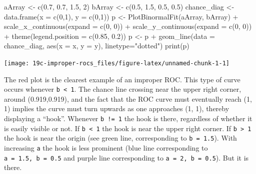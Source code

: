 \documentclass[
]{book}
\newenvironment{Shaded}{\begin{snugshade}}{\end{snugshade}}
\newcommand{\AttributeTok}[1]{\textcolor[rgb]{0.77,0.63,0.00}{#1}}
\newcommand{\DecValTok}[1]{\textcolor[rgb]{0.00,0.00,0.81}{#1}}
\newcommand{\FloatTok}[1]{\textcolor[rgb]{0.00,0.00,0.81}{#1}}
\newcommand{\FunctionTok}[1]{\textcolor[rgb]{0.00,0.00,0.00}{#1}}
\newcommand{\NormalTok}[1]{#1}
\newcommand{\OtherTok}[1]{\textcolor[rgb]{0.56,0.35,0.01}{#1}}
\newcommand{\SpecialCharTok}[1]{\textcolor[rgb]{0.00,0.00,0.00}{#1}}
\newcommand{\StringTok}[1]{\textcolor[rgb]{0.31,0.60,0.02}{#1}}
\begin{document}
\begin{Shaded}
\begin{Highlighting}[]
\NormalTok{  aArray }\OtherTok{\textless{}{-}} \FunctionTok{c}\NormalTok{(}\FloatTok{0.7}\NormalTok{, }\FloatTok{0.7}\NormalTok{, }\FloatTok{1.5}\NormalTok{, }\DecValTok{2}\NormalTok{)}
\NormalTok{  bArray }\OtherTok{\textless{}{-}} \FunctionTok{c}\NormalTok{(}\FloatTok{0.5}\NormalTok{, }\FloatTok{1.5}\NormalTok{, }\FloatTok{0.5}\NormalTok{, }\FloatTok{0.5}\NormalTok{)}
\NormalTok{  chance\_diag }\OtherTok{\textless{}{-}} \FunctionTok{data.frame}\NormalTok{(}\AttributeTok{x =} \FunctionTok{c}\NormalTok{(}\DecValTok{0}\NormalTok{,}\DecValTok{1}\NormalTok{), }\AttributeTok{y =} \FunctionTok{c}\NormalTok{(}\DecValTok{0}\NormalTok{,}\DecValTok{1}\NormalTok{))}
\NormalTok{  p }\OtherTok{\textless{}{-}} \FunctionTok{PlotBinormalFit}\NormalTok{(aArray, bArray) }\SpecialCharTok{+}
    \FunctionTok{scale\_x\_continuous}\NormalTok{(}\AttributeTok{expand =} \FunctionTok{c}\NormalTok{(}\DecValTok{0}\NormalTok{, }\DecValTok{0}\NormalTok{)) }\SpecialCharTok{+} 
    \FunctionTok{scale\_y\_continuous}\NormalTok{(}\AttributeTok{expand =} \FunctionTok{c}\NormalTok{(}\DecValTok{0}\NormalTok{, }\DecValTok{0}\NormalTok{)) }\SpecialCharTok{+}
    \FunctionTok{theme}\NormalTok{(}\AttributeTok{legend.position =} \FunctionTok{c}\NormalTok{(}\FloatTok{0.85}\NormalTok{, }\FloatTok{0.2}\NormalTok{))}
\NormalTok{p }\OtherTok{\textless{}{-}}\NormalTok{ p }\SpecialCharTok{+} \FunctionTok{geom\_line}\NormalTok{(}\AttributeTok{data =}\NormalTok{ chance\_diag, }\FunctionTok{aes}\NormalTok{(}\AttributeTok{x =}\NormalTok{ x, }\AttributeTok{y =}\NormalTok{ y), }\AttributeTok{linetype=}\StringTok{"dotted"}\NormalTok{)}
\FunctionTok{print}\NormalTok{(p)}
\end{Highlighting}
\end{Shaded}

\begin{center}\texttt{[image: 19c-improper-rocs\_files/figure-latex/unnamed-chunk-1-1]} \end{center}

The red plot is the clearest example of an improper ROC. This type of curve occurs whenever \texttt{b\ \textless{}\ 1}. The chance line crossing near the upper right corner, around (0.919,0.919), and the fact that the ROC curve must eventually reach (1, 1) implies the curve must turn upwards as one approaches (1, 1), thereby displaying a ``hook''. Whenever \texttt{b\ !=\ 1} the hook is there, regardless of whether it is easily visible or not. If \texttt{b\ \textless{}\ 1} the hook is near the upper right corner. If \texttt{b\ \textgreater{}\ 1} the hook is near the origin (see green line, corresponding to \texttt{b\ =\ 1.5}). With increasing \texttt{a} the hook is less prominent (blue line corresponding to \texttt{a\ =\ 1.5,\ b\ =\ 0.5} and purple line corresponding to \texttt{a\ =\ 2,\ b\ =\ 0.5}). But it is there.
\end{document}
